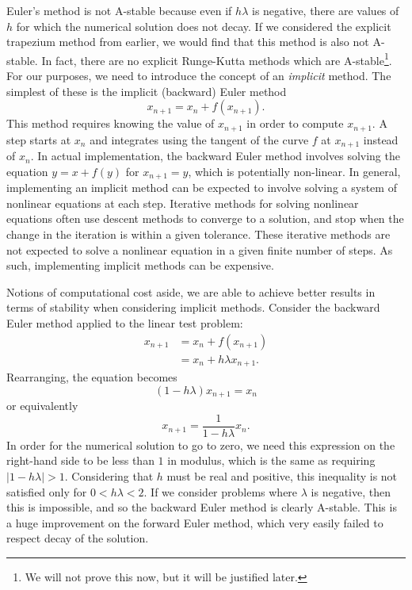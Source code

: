 Euler's method is not A-stable because even if $h \lambda$ is negative, there are values of $h$ for which the numerical solution does not decay.
If we considered the explicit trapezium method from earlier, we would find that this method is also not A-stable.
In fact, there are no explicit Runge-Kutta methods which are A-stable\footnote{
    We will not prove this now, but it will be justified later.
}.
For our purposes, we need to introduce the concept of an \textit{implicit} method.
The simplest of these is the implicit (backward) Euler method
\begin{equation}
    x_{n+1} = x_n + f(x_{n+1}).
\end{equation}
This method requires knowing the value of $x_{n+1}$ in order to compute $x_{n+1}$.
A step starts at $x_n$ and integrates using the tangent of the curve $f$ at $x_{n+1}$ instead of $x_n$.
In actual implementation, the backward Euler method involves solving the equation $y = x + f(y)$ for $x_{n+1} = y$, which is potentially non-linear.
In general, implementing an implicit method can be expected to involve solving a system of nonlinear equations at each step.
Iterative methods for solving nonlinear equations often use descent methods to converge to a solution, and stop when the change in the iteration is within a given tolerance.
These iterative methods are not expected to solve a nonlinear equation in a given finite number of steps.
As such, implementing implicit methods can be expensive.

Notions of computational cost aside, we are able to achieve better results in terms of stability when considering implicit methods.
Consider the backward Euler method applied to the linear test problem:
\begin{align*}
    x_{n+1} &= x_n + f(x_{n+1}) \\
    &= x_n + h\lambda x_{n+1}.
\end{align*}
Rearranging, the equation becomes
\begin{equation*}
    (1 - h \lambda)x_{n+1} = x_n
\end{equation*}
or equivalently
\begin{equation*}
    x_{n+1} = \frac{1}{1- h \lambda} x_n.
\end{equation*}
In order for the numerical solution to go to zero,
we need this expression on the right-hand side to be less than $1$ in modulus,
which is the same as requiring $|1 - h \lambda| > 1$.
Considering that $h$ must be real and positive,
this inequality is not satisfied only for $0 < h \lambda < 2$.
If we consider problems where $\lambda$ is negative, then this is impossible, and so the backward Euler method is clearly A-stable.
This is a huge improvement on the forward Euler method, which very easily failed to respect decay of the solution.

